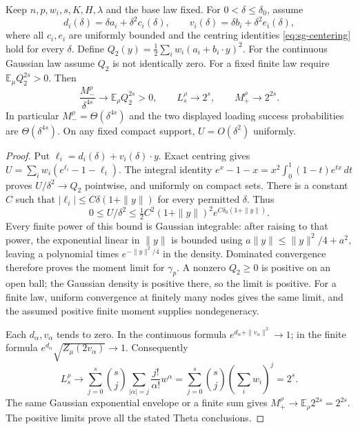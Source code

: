 \begin{proposition}
\label{prop:sg-weak-dispersion}
Keep $n,p,w_i,s,K,H,\lambda$ and the base law fixed.
For $0<\delta\leq\delta_0$, assume
\[
 d_i(\delta)=\delta a_i+\delta^2 c_i(\delta),\qquad
 v_i(\delta)=\delta b_i+\delta^2 e_i(\delta),
\]
where all $c_i,e_i$ are uniformly bounded and the centring identities
\eqref{eq:sg-centering} hold for every $\delta$.
Define
$Q_2(y)=\tfrac12\sum_iw_i(a_i+b_i\cdot y)^2$.
For the continuous Gaussian law assume $Q_2$ is not identically
zero. For a fixed finite law require
$\mathbb E_\mu Q_2^{2s}>0$.
Then
\[
 \frac{M_-^\rho}{\delta^{4s}}\longrightarrow
       \mathbb E_\rho Q_2^{2s}>0,\qquad
 L_s^\rho\longrightarrow2^s,\qquad
 M_+^\rho\longrightarrow2^{2s}.
\]
In particular $M_-^\rho=\Theta(\delta^{4s})$ and the two displayed
loading success probabilities are $\Theta(\delta^{4s})$.
On any fixed compact support, $U=O(\delta^2)$ uniformly.
\end{proposition}
\begin{proof}
Put $\ell_i=d_i(\delta)+v_i(\delta)\cdot y$.
Exact centring gives
$U=\sum_iw_i(e^{\ell_i}-1-\ell_i)$.
The integral identity
$e^x-1-x=x^2\int_0^1(1-t)e^{tx}\,dt$ proves
$U/\delta^2\to Q_2$ pointwise, and uniformly on compact sets.
There is a constant $C$ such that
$|\ell_i|\leq C\delta(1+\|y\|)$ for every permitted $\delta$.
Thus
\[
 0\leq U/\delta^2\leq
       \tfrac12 C^2(1+\|y\|)^2
                      e^{C\delta_0(1+\|y\|)}.
\]
Every finite power of this bound is Gaussian integrable: after
raising to that power, the exponential linear in $\|y\|$ is
bounded using $a\|y\|\leq\|y\|^2/4+a^2$, leaving a polynomial
times $e^{-\|y\|^2/4}$ in the density.
Dominated convergence therefore proves the moment limit for
$\gamma_p$. A nonzero $Q_2\geq0$ is positive on an open ball;
the Gaussian density is positive there, so the limit is positive.
For a finite law, uniform convergence at finitely many nodes gives
the same limit, and the assumed positive finite moment supplies
nondegeneracy.

Each $d_\alpha,v_\alpha$ tends to zero. In the continuous formula
$e^{d_\alpha+\|v_\alpha\|^2}\to1$; in the finite formula
$e^{d_\alpha}\sqrt{Z_\mu(2v_\alpha)}\to1$.
Consequently
\[
 L_s^\rho\to\sum_{j=0}^s\binom sj
      \sum_{|\alpha|=j}\frac{j!}{\alpha!}w^\alpha
    =\sum_{j=0}^s\binom sj(\sum_iw_i)^j=2^s.
\]
The same Gaussian exponential envelope or a finite sum gives
$M_+^\rho\to\mathbb E_\rho2^{2s}=2^{2s}$.
The positive limits prove all the stated Theta conclusions.
\end{proof}

